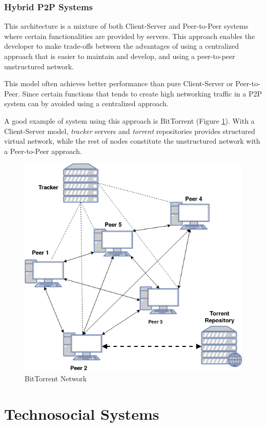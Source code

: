 \subsubsection*{Hybrid P2P Systems}
This architecture is a mixture of both Client-Server and Peer-to-Peer systems where certain functionalities are provided by servers\cite{hybrid-p2p}. This approach enables the developer to make trade-offs between the advantages of using a centralized approach that is easier to maintain and develop, and using a peer-to-peer unstructured network.

This model often achieves better performance than pure Client-Server or Peer-to-Peer. Since certain functions that tends to create high networking traffic in a P2P system can by avoided using a centralized approach.

A good example of system using this approach is BitTorrent\cite{bittorrent} (Figure \ref{fig:bittorrent}). With a Client-Server model, \textit{tracker} servers and \textit{torrent} repositories provides structured virtual network, while the rest of nodes constitute the unstructured network with a Peer-to-Peer approach.

\begin{figure}[h!]
    \centering
    \includegraphics[width=0.5\linewidth]{assets/images/bittorrent.png}
    \caption{BitTorrent Network}
    \label{fig:bittorrent}
\end{figure}  




\section{Technosocial Systems}
